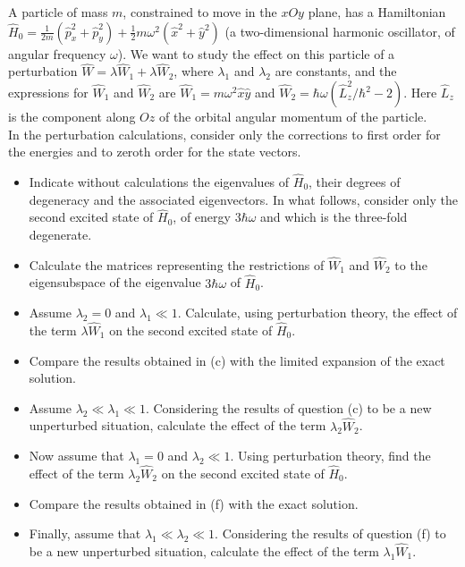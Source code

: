 \documentclass[10pt,a4paper]{article}
\newenvironment{problem}[2][Problem]{\begin{trivlist}
\item[\hskip \labelsep {\bfseries #1}\hskip \labelsep {\bfseries #2.}]}{\end{trivlist}}
\begin{document}
\begin{problem}{2}
[C-T Exercise 11-3] A particle of mass $m$, constrained to move in the $xOy$ plane, has a Hamiltonian $\hat{H}_0=\frac{1}{2m}(\hat{p}_x^2+\hat{p}_y^2)+\frac{1}{2}m\omega^2(\hat{x}^2+\hat{y}^2)$ (a two-dimensional harmonic oscillator, of angular frequency $\omega$). We want to study the effect on this particle of a perturbation $\hat{W}=\lambda\hat{W}_1+\lambda\hat{W}_2$, where $\lambda_1$ and $\lambda_2$ are constants, and the expressions for $\hat{W}_1$ and $\hat{W}_2$ are $\hat{W}_1=m\omega^2\hat{x}\hat{y}$ and $\hat{W}_2=\hbar\omega(\hat{L}_z^2/\hbar^2-2)$. Here $\hat{L}_z$ is the component along $Oz$ of the orbital angular momentum of the particle.\\
In  the perturbation calculations, consider only the corrections to first order for the energies and to zeroth order for the state vectors.
\begin{itemize}
\item[(a)] Indicate without calculations the eigenvalues of $\hat{H}_0$, their degrees of degeneracy and the associated eigenvectors. In what follows, consider only the second excited state of $\hat{H}_0$, of energy $3\hbar\omega$ and which is the three-fold degenerate.
\item[(b)] Calculate the matrices representing the restrictions of $\hat{W}_1$ and $\hat{W}_2$ to the eigensubspace of the eigenvalue $3\hbar\omega$ of $\hat{H}_0$.
\item[(c)] Assume $\lambda_2=0$ and $\lambda_1\ll1$. Calculate, using perturbation theory, the effect of the term $\lambda\hat{W}_1$ on the second excited state of $\hat{H}_0$.
\item[(d)] Compare the results obtained in (c) with the limited expansion of the exact solution.
\item[(e)] Assume $\lambda_2\ll\lambda_1\ll1$. Considering the results of question (c) to be a new unperturbed situation, calculate the effect of the term $\lambda_2\hat{W}_2$.
\item[(f)] Now assume that $\lambda_1=0$ and $\lambda_2\ll1$. Using perturbation theory, find the effect of the term $\lambda_2\hat{W}_2$ on the second excited state of $\hat{H}_0$.
\item[(g)] Compare the results obtained in (f) with the exact solution.
\item[(h)] Finally, assume that $\lambda_1\ll\lambda_2\ll1$. Considering the results of question (f) to be a new unperturbed situation, calculate the effect of the term $\lambda_1\hat{W}_1$.
\end{itemize}
\end{problem}
\end{document}
